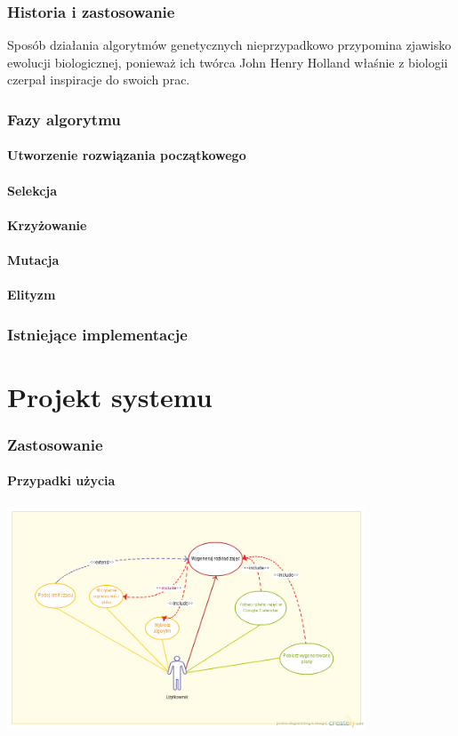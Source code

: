 \documentclass[11pt]{report}
\begin{document}
\subsection{Historia i zastosowanie}
Sposób działania algorytmów genetycznych nieprzypadkowo przypomina zjawisko ewolucji biologicznej, ponieważ ich twórca John Henry Holland właśnie z biologii czerpał inspiracje do swoich prac. 
\subsection{Fazy algorytmu}
\subsubsection{Utworzenie rozwiązania początkowego}
\subsubsection{Selekcja}
\subsubsection{Krzyżowanie}
\subsubsection{Mutacja}
\subsubsection{Elityzm}
\subsection{Istniejące implementacje}
\chapter{Projekt systemu}
\subsection{Zastosowanie}
\subsubsection{Przypadki użycia}
\par
\includegraphics[width=0.8\textwidth]{InzynierkaUseCase.png}
\end{document}
